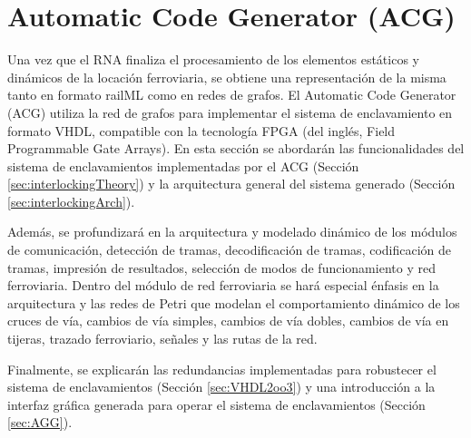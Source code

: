 \chapter{Automatic Code Generator (ACG)}
\label{sec:ACG}
    
    Una vez que el RNA finaliza el procesamiento de los elementos estáticos y dinámicos de la locación ferroviaria, se obtiene una representación de la misma tanto en formato railML como en redes de grafos. El Automatic Code Generator (ACG) utiliza la red de grafos para implementar el sistema de enclavamiento en formato VHDL, compatible con la tecnología FPGA (del inglés, Field Programmable Gate Arrays). En esta sección se abordarán las funcionalidades del sistema de enclavamientos implementadas por el ACG (Sección \ref{sec:interlockingTheory}) y la arquitectura general del sistema generado (Sección \ref{sec:interlockingArch}). 
    
    
    Además, se profundizará en la arquitectura y modelado dinámico de los módulos de comunicación, detección de tramas, decodificación de tramas, codificación de tramas, impresión de resultados, selección de modos de funcionamiento y red ferroviaria. Dentro del módulo de red ferroviaria se hará especial énfasis en la arquitectura y las redes de Petri que modelan el comportamiento dinámico de los cruces de vía, cambios de vía simples, cambios de vía dobles, cambios de vía en tijeras, trazado ferroviario, señales y las rutas de la red.
    
    Finalmente, se explicarán las redundancias implementadas para robustecer el sistema de enclavamientos (Sección \ref{sec:VHDL2oo3}) y una introducción a la interfaz gráfica generada para operar el sistema de enclavamientos (Sección \ref{sec:AGG}).
    
     
        
    
    